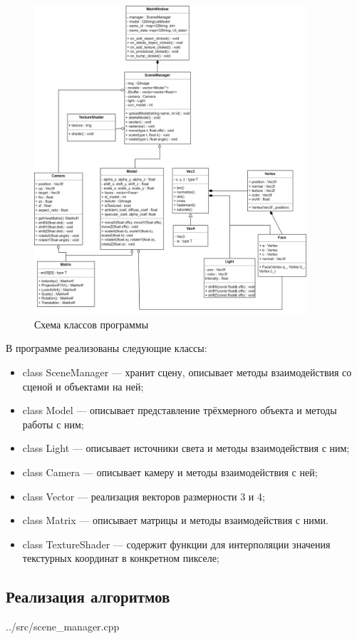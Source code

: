 \begin{figure}[h]
	\centering
	\includegraphics[width=0.9\textwidth]{img/algorithms/struct.png}
	\caption{Схема классов программы}
	\label{fig:struct}
\end{figure}
\clearpage
В программе реализованы следующие классы:
\begin{itemize}
	\item class SceneManager --- хранит сцену, описывает методы взаимодействия со сценой и объектами на ней;
	\item class Model --- описывает представление трёхмерного объекта и методы работы с ним;
	\item class Light --- описывает источники света и методы взаимодействия с ним;
	\item class Camera --- описывает камеру и методы взаимодействия с ней;
	\item class Vector --- реализация векторов размерности 3 и 4;
	\item class Matrix --- описывает матрицы и методы взаимодействия с ними.
	\item class TextureShader --- содержит функции для интерполяции значения текстурных координат в конкретном пикселе;
\end{itemize}

\subsection{Реализация алгоритмов}
\begin{lstinputlisting}[
	caption={Алгоритм растеризации каждого объекта},
	label={lst:rasterize_object},
	linerange={71-86}
	]{../src/scene_manager.cpp}
\end{lstinputlisting}

